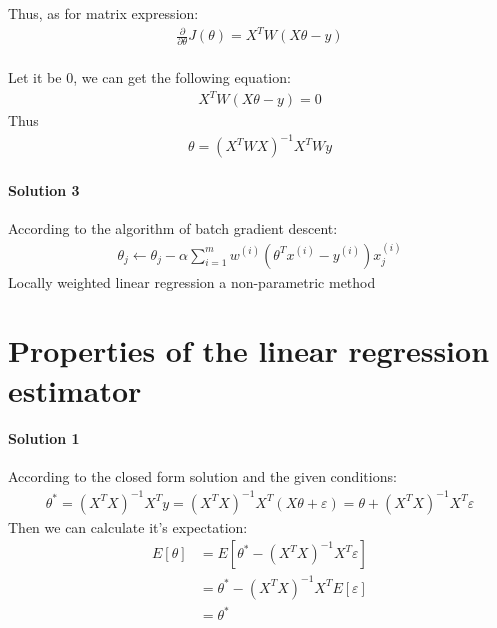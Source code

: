 \documentclass[paper=a4, fontsize=11pt]{scrartcl} %
\numberwithin{equation}{section} %
\numberwithin{figure}{section} %
\numberwithin{table}{section} %
\begin{document}
Thus, as for matrix expression:
\begin{align*}
\frac{\partial }{\partial \theta}J\left ( \theta  \right )=X^{T}W\left ( X\theta -y \right )
\end{align*}
\\ Let it be 0, we can get the following equation:
\begin{align*}
X^{T}W\left ( X\theta -y \right )=0
\end{align*}
Thus
\begin{align*}
\theta =\left ( X^{T}WX \right )^{-1}X^{T}Wy
\end{align*}

\paragraph{\textbf{Solution 3}}
According to the algorithm of batch gradient descent:
\begin{align*}
\theta _{j}\leftarrow \theta _{j}-\alpha\sum_{i=1}^{m}w^{\left ( i \right )}\left ( \theta ^{T}x^{\left ( i \right )}-y^{\left ( i \right )} \right )x_{j}^{\left ( i \right )}
\end{align*}
Locally weighted linear regression a non-parametric method

\section{Properties of the linear regression estimator}
\paragraph{\textbf{Solution 1}}
According to the closed form solution and the given conditions:
\begin{align*}
\theta ^{*}=\left ( X^{T}X \right )^{-1}X^{T}y=\left ( X^{T}X \right )^{-1}X^{T}\left ( X\theta +\varepsilon  \right )=\theta +\left ( X^{T}X \right )^{-1}X^{T}\varepsilon
\end{align*}
Then we can calculate it's expectation:
\begin{align*}
E\left [ \theta \right ]&=E\left [ \theta^{*} -\left ( X^{T}X \right )^{-1}X^{T}\varepsilon  \right ]
\\ &=\theta^{*} -\left ( X^{T}X \right )^{-1}X^{T}E\left [ \varepsilon  \right ]
\\ &=\theta^{*}
\end{align*}
\end{document}
